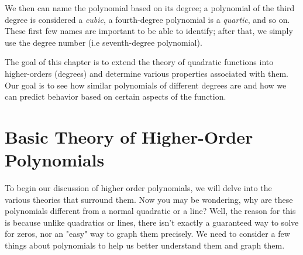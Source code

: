 \documentclass[lang=en,11pt]{elegantbook}
\begin{document}
We then can name the polynomial based on its degree; a polynomial of the third degree is considered a \textit{cubic}, a fourth-degree polynomial is a \textit{quartic}, and so on.  These first few names are important to be able to identify; after that, we simply use the degree number (i.e seventh-degree polynomial).

The goal of this chapter is to extend the theory of quadratic functions into higher-orders (degrees) and determine various properties associated with them.  Our goal is to see how similar polynomials of different degrees are and how we can predict behavior based on certain aspects of the function.
\section{Basic Theory of Higher-Order Polynomials}
\noindent To begin our discussion of higher order polynomials, we will delve into the various theories that surround them. Now you may be wondering, why are these polynomials different from a normal quadratic or a line? Well, the reason for this is because unlike quadratics or lines, there isn't exactly a guaranteed way to solve for zeros, nor an "easy" way to graph them precisely.  We need to consider a few things about polynomials to help us better understand them and graph them.
\end{document}
